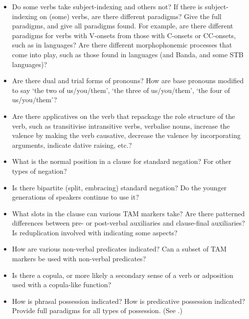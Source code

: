 \begin{itemize}
	\item	Do some verbs take subject-indexing
				and others not? If there is subject-indexing on (some) verbs,
				are there different paradigms? Give the full paradigms,
				and give all paradigms found.
				For example, are there different paradigms for verbs with V-onsets
				from those with C-onsets or CC-onsets,
				such as in  languages? Are there different morphophonemic
				processes that come into play,
				such as those found in  languages (and Banda,
				and some STB languages)?

	\item	Are there dual
				and trial forms of pronouns? How are base pronouns modified to
				say ‘the two of us/you/them’,
				‘the three of us/you/them’,
				‘the four of us/you/them’?

	\item	Are there applicatives on the verb that repackage the role
				structure of the verb,
				such as transitivise intransitive verbs,
				verbalise nouns, increase the valence by making the verb causative,
				decrease the valence by incorporating arguments,
				indicate dative raising, etc.?

	\item	What is the normal position in a clause for standard negation?
				For other types of negation?

	\item	Is there bipartite (split,
				embracing) standard negation? Do the younger generations of speakers
				continue to use it?

	\item	What slots in the clause can various TAM markers take? Are
				there patterned differences between pre- or post-verbal auxiliaries
				and clause-final auxiliaries? Is reduplication involved with
				indicating some aspects?
				
	\item	How are various non-verbal predicates indicated? Can a subset
				of TAM markers be used with non-verbal predicates?

	\item	Is there a copula,
				or more likely a secondary sense of a verb or adposition used
				with a copula-like function?

	\item	How is phrasal possession indicated? How is predicative possession
				indicated? Provide full paradigms for all types of possession.
				(See .)
	

\end{itemize}
